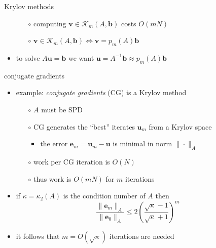 \documentclass[hide notes,intlimits,usenames,dvipsnames]{beamer}
\newcommand{\bb}{\mathbf{b}}
\newcommand{\be}{\mathbf{e}}
\newcommand{\bu}{\mathbf{u}}
\newcommand{\bv}{\mathbf{v}}
\begin{document}
\begin{frame}{Krylov methods}
\begin{itemize}
    \vspace{2mm}
	\begin{itemize}
	\item[$\circ$] computing $\bv \in \mathcal{K}_m(A,\bb)$ costs $O(mN)$
	\item[$\circ$] $\bv \in \mathcal{K}_m(A,\bb) \iff \bv = p_m(A) \bb$
	\end{itemize}
\item to solve $A\bu=\bb$ we want $\bu = A^{-1}\bb \approx p_m(A) \bb$
\end{itemize}
\end{frame}


\begin{frame}{conjugate gradients}

\begin{itemize}
\item example: \emph{conjugate gradients} (CG) is a Krylov method
	\begin{itemize}
	\item[$\circ$] $A$ must be SPD
	\item[$\circ$] CG generates the ``best'' iterates $\bu_m$ from a Krylov space
		\begin{itemize}
		\item the error $\be_m=\bu_m-\bu$ is minimal in norm $\|\cdot\|_A$
		\end{itemize}
	\item[$\circ$] work per CG iteration is $O(N)$
	\item[$\circ$] thus work is $O(mN)$ for $m$ iterations
	\end{itemize}
\item if $\kappa=\kappa_2(A)$ is the condition number of $A$ then
	$$\frac{\|\be_m\|_A}{\|\be_0\|_A} \le 2 \left(\frac{\sqrt{\kappa}-1}{\sqrt{\kappa}+1}\right)^m$$
\item it follows that $m = O(\sqrt{\kappa})$ iterations are needed
\end{itemize}
\end{frame}
\end{document}
